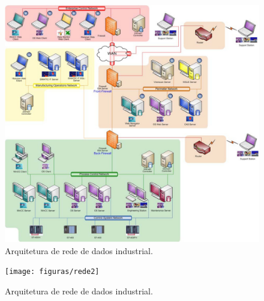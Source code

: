 \begin{figure}[hbt]
	\begin{center}
		\includegraphics[width=\textwidth]{figuras/rede}
	\end{center}
	\caption{Arquitetura de rede de dados industrial.}
	\label{fig:rede}
\end{figure}

\begin{figure}[hbt]
	\begin{center}
		\texttt{[image: figuras/rede2]}
	\end{center}
	\caption{Arquitetura de rede de dados industrial.}
	\label{fig:rede2}
\end{figure}
